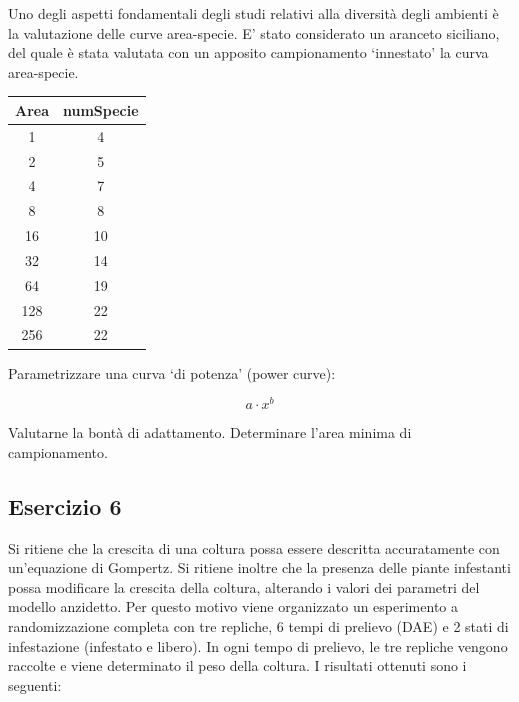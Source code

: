 \documentclass[a4paper,12pt,oneside]{book}
\begin{document}
Uno degli aspetti fondamentali degli studi relativi alla diversità degli ambienti è la valutazione delle curve area-specie. E' stato considerato un aranceto siciliano, del quale è stata valutata con un apposito campionamento `innestato' la curva area-specie.

\begin{longtable}[]{@{}cc@{}}
\toprule
Area & numSpecie \\
\midrule
\endhead
1 & 4 \\
2 & 5 \\
4 & 7 \\
8 & 8 \\
16 & 10 \\
32 & 14 \\
64 & 19 \\
128 & 22 \\
256 & 22 \\
\bottomrule
\end{longtable}

Parametrizzare una curva `di potenza' (power curve):

\[a \cdot x^b\]

Valutarne la bontà di adattamento. Determinare l'area minima di campionamento.

\hypertarget{esercizio-6-3}{%
\subsection{Esercizio 6}\label{esercizio-6-3}}

Si ritiene che la crescita di una coltura possa essere descritta accuratamente con un'equazione di Gompertz. Si ritiene inoltre che la presenza delle piante infestanti possa modificare la crescita della coltura, alterando i valori dei parametri del modello anzidetto. Per questo motivo viene organizzato un esperimento a randomizzazione completa con tre repliche, 6 tempi di prelievo (DAE) e 2 stati di infestazione (infestato e libero). In ogni tempo di prelievo, le tre repliche vengono raccolte e viene determinato il peso della coltura. I risultati ottenuti sono i seguenti:
\end{document}
